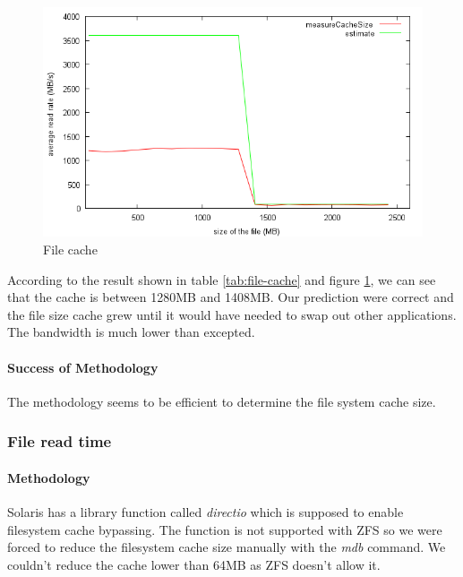 \begin{figure}[h]
\begin{center}
\includegraphics[scale=0.8]{fileCacheImage}
\end{center}
\caption {File cache\label{fig:file-cache}}

\end{figure}

According to the result shown in table \ref{tab:file-cache} and figure \ref{fig:file-cache}, we can see that the cache
is between 1280MB and 1408MB.
Our prediction were correct and the file size cache grew until it would have
needed to swap out other applications.
The bandwidth is much lower than excepted. 

\paragraph{Success of Methodology}
The methodology seems to be efficient to determine the file system cache size.


\subsubsection{File read time}

\paragraph{Methodology}
Solaris has a library function called \emph{directio} which is supposed to
enable filesystem cache bypassing.
The function is not supported with ZFS so we were forced to reduce the
filesystem cache size manually with the \emph{mdb} command\cite{zfs-evil-tuning}.
We couldn't reduce the cache lower than 64MB as ZFS doesn't allow
it\cite{zfs-arc-max}.

